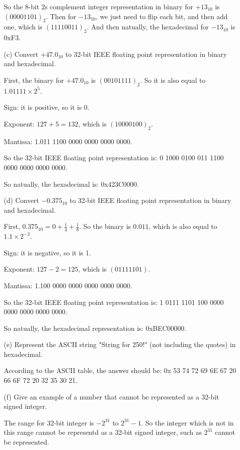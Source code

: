 \documentclass{article}
\theoremstyle{remark}
\theoremstyle{definition}
\begin{document}
\begin{enumerate}
        So the 8-bit 2s complement integer representation in binary for $+13_{10}$ is $\left( 00001101 \right)_2$. Then for $-13_{10}$, we just need to flip each bit, and then add one, which is $\left( 11110011 \right)_2$. And then natually, the hexadecimal for $-13_{10}$ is 0xF3.
        \item[(c)] Convert $+47.0_{10}$ to 32-bit IEEE floating point representation in binary and hexadecimal.

        First, the binary for $+47.0_{10}$ is $\left( 00101111 \right)_2$. So it is also equal to $1.01111\times 2^5$.

        Sign: it is positive, so it is 0.

        Exponent: $127+5=132$, which is $\left( 1000 0100 \right)_2$.

        Mantissa: 1.011 1100 0000 0000 0000 0000.

        So the 32-bit IEEE floating point representation is: 0 1000 0100 011 1100 0000 0000 0000 0000.

        So natually, the hexadecimal is: 0x423C0000.

        \item[(d)] Convert $-0.375_{10}$ to 32-bit IEEE floating point representation in binary and hexadecimal.

        First, $0.375_{10} = 0 + \frac{1}{4} + \frac{1}{8}$. So the binary is $0.011$, which is also equal to $1.1 \times 2^{-2}$.

        Sign: it is negative, so it is 1.

        Exponent: $127 - 2 = 125$, which is $\left( 0111 1101 \right)$.

        Mantissa: 1.100 0000 0000 0000 0000 0000.

        So the 32-bit IEEE floating point representation is: 1 0111 1101 100 0000 0000 0000 0000 0000.

        So natually, the hexadecimal representation is: 0xBEC00000.
        \item[(e)] Represent the ASCII string "String for 250!" (not including the quotes) in hexadecimal.

        According to the ASCII table, the answer should be: 0x 53 74 72 69 6E 67 20 66 6F 72 20 32 35 30 21.
        \item[(f)] Give an example of a number that cannot be represented as a 32-bit signed integer.

        The range for 32-bit integer is $-2^{31}$ to $2^{31} - 1$. So the integer which is not in this range cannot be representd as a 32-bit signed integer, such as $2^{31}$ cannot be represented.


    \end{enumerate}
\end{document}
